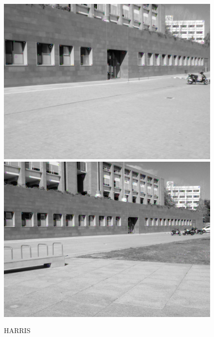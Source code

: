		\begin{figure}[!htb]
				\includegraphics[width=\linewidth]{images/experiments/KP_HARRIS_2}
				\label{fig:awesome_image1}
			\endminipage\hfill
				\includegraphics[width=\linewidth]{images/experiments/KP_HARRIS_3}
				\label{fig:awesome_image2}
			\endminipage
			\caption{HARRIS}
		\end{figure}
